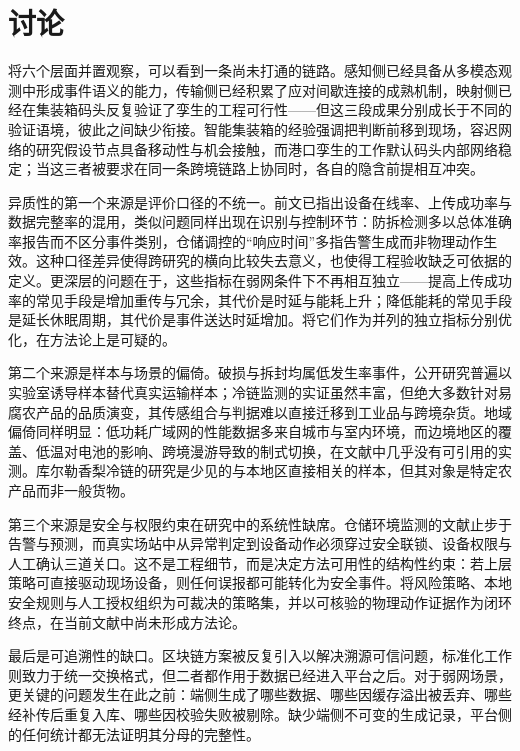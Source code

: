 \documentclass[11pt,a4paper]{article}
\begin{document}
\section{讨论}

将六个层面并置观察，可以看到一条尚未打通的链路。感知侧已经具备从多模态观测中形成事件语义的能力，传输侧已经积累了应对间歇连接的成熟机制，映射侧已经在集装箱码头反复验证了孪生的工程可行性——但这三段成果分别成长于不同的验证语境，彼此之间缺少衔接。智能集装箱的经验强调把判断前移到现场\cite{doi978303088662211}，容迟网络的研究假设节点具备移动性与机会接触\cite{doiiccnc20126167525}，而港口孪生的工作默认码头内部网络稳定\cite{doi20236909801}；当这三者被要求在同一条跨境链路上协同时，各自的隐含前提相互冲突。

异质性的第一个来源是评价口径的不统一。前文已指出设备在线率、上传成功率与数据完整率的混用，类似问题同样出现在识别与控制环节：防拆检测多以总体准确率报告而不区分事件类别，仓储调控的“响应时间”多指告警生成而非物理动作生效。这种口径差异使得跨研究的横向比较失去意义，也使得工程验收缺乏可依据的定义。更深层的问题在于，这些指标在弱网条件下不再相互独立——提高上传成功率的常见手段是增加重传与冗余，其代价是时延与能耗上升；降低能耗的常见手段是延长休眠周期，其代价是事件送达时延增加。将它们作为并列的独立指标分别优化，在方法论上是可疑的。

第二个来源是样本与场景的偏倚。破损与拆封均属低发生率事件，公开研究普遍以实验室诱导样本替代真实运输样本；冷链监测的实证虽然丰富，但绝大多数针对易腐农产品的品质演变，其传感组合与判据难以直接迁移到工业品与跨境杂货。地域偏倚同样明显：低功耗广域网的性能数据多来自城市与室内环境，而边境地区的覆盖、低温对电池的影响、跨境漫游导致的制式切换，在文献中几乎没有可引用的实测。库尔勒香梨冷链的研究是少见的与本地区直接相关的样本\cite{doiapp9183895}，但其对象是特定农产品而非一般货物。

第三个来源是安全与权限约束在研究中的系统性缺席。仓储环境监测的文献止步于告警与预测\cite{doiaccess20263712272}，而真实场站中从异常判定到设备动作必须穿过安全联锁、设备权限与人工确认三道关口。这不是工程细节，而是决定方法可用性的结构性约束：若上层策略可直接驱动现场设备，则任何误报都可能转化为安全事件。将风险策略、本地安全规则与人工授权组织为可裁决的策略集，并以可核验的物理动作证据作为闭环终点，在当前文献中尚未形成方法论。

最后是可追溯性的缺口。区块链方案被反复引入以解决溯源可信问题\cite{doiaccess20192940227}，标准化工作则致力于统一交换格式\cite{doipbtr034ech3}，但二者都作用于数据已经进入平台之后。对于弱网场景，更关键的问题发生在此之前：端侧生成了哪些数据、哪些因缓存溢出被丢弃、哪些经补传后重复入库、哪些因校验失败被剔除。缺少端侧不可变的生成记录，平台侧的任何统计都无法证明其分母的完整性。
\end{document}
